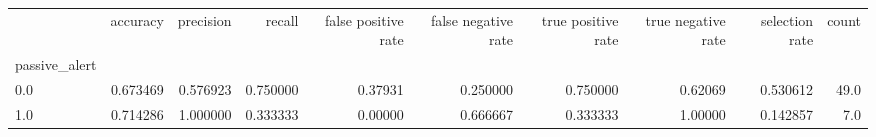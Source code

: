 \begin{tabular}{lrrrrrrrrr}
\toprule
{} &  accuracy &  precision &    recall &  false positive rate &  false negative rate &  true positive rate &  true negative rate &  selection rate &  count \\
passive\_alert &           &            &           &                      &                      &                     &                     &                 &        \\
\midrule
0.0           &  0.673469 &   0.576923 &  0.750000 &              0.37931 &             0.250000 &            0.750000 &             0.62069 &        0.530612 &   49.0 \\
1.0           &  0.714286 &   1.000000 &  0.333333 &              0.00000 &             0.666667 &            0.333333 &             1.00000 &        0.142857 &    7.0 \\
\bottomrule
\end{tabular}
